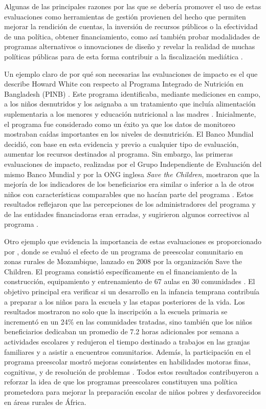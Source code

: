 \documentclass[../../main.tex]{subfiles}
\begin{document}
Algunas de las principales razones por las que se debería promover el uso de estas
evaluaciones como herramientas de gestión provienen del hecho que permiten mejorar la
rendición de cuentas, la inversión de recursos públicos o la efectividad de una política,
obtener financiamiento, como así también probar modalidades de programas alternativos o
innovaciones de diseño \cite{gertler-2016} y revelar la realidad de muchas políticas
públicas para de esta forma contribuir a la fiscalización mediática \cite{bernal}.

Un ejemplo claro de por qué son necesarias las evaluaciones de impacto es el que describe
Howard White con respecto al Programa Integrado de Nutrición en Bangladesh (PINB)
\cite{white2009theory}. Este programa identificaba, mediante mediciones en campo, a los
niños desnutridos y los asignaba a un tratamiento que incluía alimentación suplementaria a
los menores y educación nutricional a las madres \cite{bernal}. Inicialmente, el programa
fue considerado como un éxito ya que los datos de monitoreo mostraban caídas importantes
en los niveles de desnutrición. El Banco Mundial decidió, con base en esta evidencia y
previo a cualquier tipo de evaluación, aumentar los recursos destinados al programa. Sin
embargo, las primeras evaluaciones de impacto, realizadas por el Grupo Independiente de
Evaluación del mismo Banco Mundial y por la ONG inglesa \textit{Save the Children},
mostraron que la mejoría de los indicadores de los beneficiarios era similar o inferior a
la de otros niños con características comparables que no hacían parte del programa
\cite{bernal}. Estos resultados reflejaron que las percepciones de los administradores del
programa y de las entidades financiadoras eran erradas, y sugirieron algunos correctivos
al programa \cite{bernal}.

Otro ejemplo que evidencia la importancia de estas evaluaciones es proporcionado por
\cite{preschool-africa-2012}, donde se evaluó el efecto de un programa de preescolar
comunitario en zonas rurales de Mozambique, lanzado en 2008 por la organización Save the
Children. El programa consistió específicamente en el financiamiento de la construcción,
equipamiento y entrenamiento de 67 aulas en 30 comunidades \cite{preschool-africa-2012}. El
objetivo principal era verificar si un desarrollo en la infancia temprana contribuía a
preparar a los niños para la escuela y las etapas posteriores de la vida. Los resultados
mostraron no solo que la inscripción a la escuela primaria se incrementó en un 24\% en las
comunidades tratadas, sino también que los niños beneficiarios dedicaban un promedio de
7.2 horas adicionales por semana a actividades escolares y redujeron el tiempo destinado a
trabajos en las granjas familiares y a asistir a encuentros comunitarios. Además, la
participación en el programa preescolar mostró mejoras consistentes en habilidades motoras
finas, cognitivas, y de resolución de problemas \cite{preschool-africa-2012}. Todos estos
resultados contribuyeron a reforzar la idea de que los programas preescolares constituyen
una política prometedora para mejorar la preparación escolar de niños pobres y
desfavorecidos en áreas rurales de África.
\end{document}
